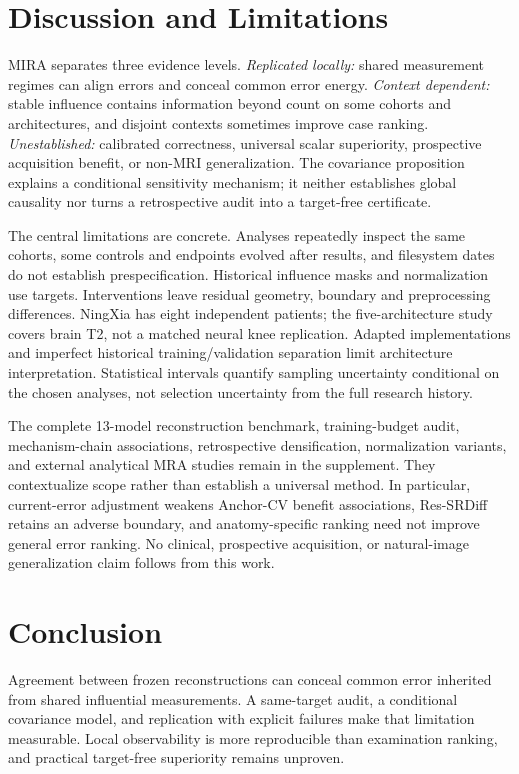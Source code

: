 \documentclass[10pt,twocolumn,letterpaper]{article}
\begin{document}
\section{Discussion and Limitations}
MIRA separates three evidence levels. \emph{Replicated locally:} shared measurement regimes can align errors and conceal common error energy. \emph{Context dependent:} stable influence contains information beyond count on some cohorts and architectures, and disjoint contexts sometimes improve case ranking. \emph{Unestablished:} calibrated correctness, universal scalar superiority, prospective acquisition benefit, or non-MRI generalization. The covariance proposition explains a conditional sensitivity mechanism; it neither establishes global causality nor turns a retrospective audit into a target-free certificate.

The central limitations are concrete. Analyses repeatedly inspect the same cohorts, some controls and endpoints evolved after results, and filesystem dates do not establish prespecification. Historical influence masks and normalization use targets. Interventions leave residual geometry, boundary and preprocessing differences. NingXia has eight independent patients; the five-architecture study covers brain T2, not a matched neural knee replication. Adapted implementations and imperfect historical training/validation separation limit architecture interpretation. Statistical intervals quantify sampling uncertainty conditional on the chosen analyses, not selection uncertainty from the full research history.

The complete 13-model reconstruction benchmark, training-budget audit, mechanism-chain associations, retrospective densification, normalization variants, and external analytical MRA studies remain in the supplement. They contextualize scope rather than establish a universal method. In particular, current-error adjustment weakens Anchor-CV benefit associations, Res-SRDiff retains an adverse boundary, and anatomy-specific ranking need not improve general error ranking. No clinical, prospective acquisition, or natural-image generalization claim follows from this work.

\section{Conclusion}
Agreement between frozen reconstructions can conceal common error inherited from shared influential measurements. A same-target audit, a conditional covariance model, and replication with explicit failures make that limitation measurable. Local observability is more reproducible than examination ranking, and practical target-free superiority remains unproven.

\clearpage
{\small}
\end{document}
